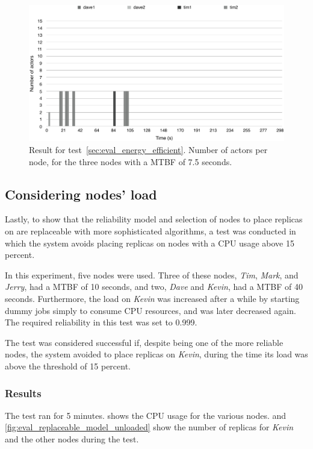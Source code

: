 \documentclass{cslthse-msc}
\begin{document}
\begin{figure}[!hbt]
\centering
\includegraphics[scale=0.5]{images/results/energy_efficient/MTBF_75.pdf}
\caption{Result for test~\ref{sec:eval_energy_efficient}. Number of actors per node, for the three nodes with a MTBF of 7.5 seconds.} \label{fig:eval_energy_efficient_mtbf_75}
\end{figure}

\subsection{Considering nodes' load} \label{sec:eval_replaceable_model}
Lastly, to show that the reliability model and selection of nodes to place replicas on are replaceable with more sophisticated algorithms, a test was conducted in which the system avoids placing replicas on nodes with a CPU usage above 15 percent. 

In this experiment, five nodes were used. Three of these nodes, \emph{Tim}, \emph{Mark}, and \emph{Jerry}, had a MTBF of 10 seconds, and two, \emph{Dave} and \emph{Kevin}, had a MTBF of 40 seconds. Furthermore, the load on \emph{Kevin} was increased after a while by starting dummy jobs simply to consume CPU resources, and was later decreased again. The required reliability in this test was set to 0.999.

The test was considered successful if, despite being one of the more reliable nodes, the system avoided to place replicas on \emph{Kevin}, during the time its load was above the threshold of 15 percent.

\subsubsection*{Results}
The test ran for 5 minutes.  shows the CPU usage for the various nodes.  and \cref{fig:eval_replaceable_model_unloaded} show the number of replicas for \emph{Kevin} and the other nodes during the test.
\end{document}

